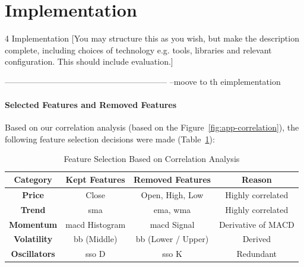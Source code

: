 \clearpage
\section{Implementation}

4 Implementation
[You may structure this as you wish, but make the description complete, including choices of
technology e.g. tools, libraries and relevant configuration. This should include evaluation.]





-----------------------------------------------------------
--moove to th eimplementation

\paragraph{Selected Features and Removed Features}
Based on our correlation analysis (based on the Figure~\ref{fig:app-correlation}), the 
following feature selection decisions were made (Table~\ref{tab:feature_selection}):

\begin{table}[H]
    \centering
    \caption{Feature Selection Based on Correlation Analysis}
    \label{tab:feature_selection}
    \begin{tabular}{cccc}
        \hline
        \textbf{Category} & \textbf{Kept Features} & \textbf{Removed Features} & \textbf{Reason} \\
        \hline\hline
        \textbf{Price} & Close & Open, High, Low & Highly correlated \\
        \textbf{Trend} & \acrshort{sma} & \acrshort{ema}, \acrshort{wma} & Highly correlated \\
        \textbf{Momentum} & \acrshort{macd} Histogram & \acrshort{macd} Signal & Derivative of MACD \\
        \textbf{Volatility} & \acrshort{bb} (Middle) & \acrshort{bb} (Lower / Upper) & Derived \\
        \textbf{Oscillators} & \acrshort{sso} D & \acrshort{sso} K & Redundant \\
        \hline
    \end{tabular}
\end{table}

